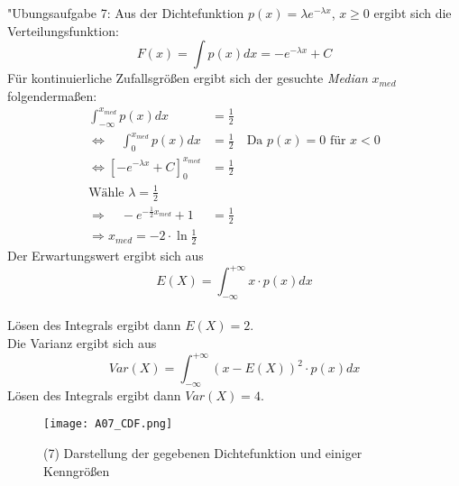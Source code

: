 

	"Ubungsaufgabe 7: \newline
	Aus der Dichtefunktion $p(x) = \lambda e^{-\lambda x}$, $x \geq 0$ ergibt sich die Verteilungsfunktion: \[F(x) = \int p(x) dx = -e^{-\lambda x} + C\]
	Für kontinuierliche Zufallsgrößen ergibt sich der gesuchte \textit{Median} $x_{med}$ folgendermaßen:
	\begin{align*}
	\int_{-\infty}^{x_{med}} p(x) dx &= \frac{1}{2} \\
	\Leftrightarrow \quad \int_0^{x_{med}} p(x) dx &= \frac{1}{2} \quad \text{Da }  p(x) = 0 \text{ für } x < 0 \\
	\Leftrightarrow \left[ -e^{-\lambda x} + C \right]_{0}^{x_{med}} &= \frac{1}{2} \\
	\text{Wähle } \lambda = \frac{1}{2} \\
	\Rightarrow \quad -e^{-\frac{1}{2}x_{med}} + 1 &= \frac{1}{2} \\
	\Rightarrow x_{med} = -2 \cdot \ln \frac{1}{2}
	\end{align*}
	Der Erwartungswert ergibt sich aus \[E(X) = \int_{-\infty}^{+\infty} x \cdot  p(x) dx\] \\
	Lösen des Integrals ergibt dann $E(X) = 2$. \\
	Die Varianz ergibt sich aus \[\textit{Var}(X) = \int_{-\infty}^{+\infty} ( x - E(X) )^2 \cdot p(x) dx\]
	Lösen des Integrals ergibt dann $\textit{Var}(X) = 4$.
	\begin{figure}
		\texttt{[image: A07\_CDF.png]}
		\caption{(7) Darstellung der gegebenen Dichtefunktion und einiger Kenngrößen}
	\end{figure}
